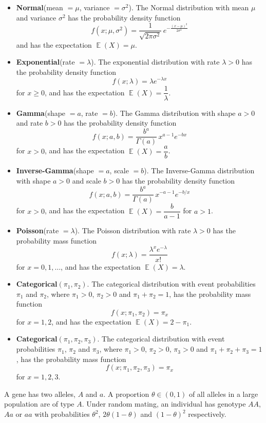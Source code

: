 \documentclass[11pt,a4paper]{article}
\newcommand{\qhead}[2]{\Needspace{10\baselineskip}\vspace{10pt}{\large\bfseries Question #1 (#2 marks)}\par\vspace{2pt}}
\DeclareMathOperator{\E}{\mathbb{E}}
\begin{document}
\begin{itemize}[itemsep=8pt]
\item \textbf{Normal}(mean $=\mu$, variance $=\sigma^2$). The Normal distribution with mean $\mu$ and variance $\sigma^2$ has the probability density function
\[ f(x;\mu,\sigma^2)=\frac{1}{\sqrt{2\pi\sigma^2}}\,e^{-\frac{(x-\mu)^2}{2\sigma^2}} \]
and has the expectation $\E(X)=\mu$.

\item \textbf{Exponential}(rate $=\lambda$). The exponential distribution with rate $\lambda>0$ has the probability density function
\[ f(x;\lambda)=\lambda e^{-\lambda x} \]
for $x\ge 0$, and has the expectation $\E(X)=\dfrac1\lambda$.

\item \textbf{Gamma}(shape $=a$, rate $=b$). The Gamma distribution with shape $a>0$ and rate $b>0$ has the probability density function
\[ f(x;a,b)=\frac{b^a}{\Gamma(a)}\,x^{a-1}e^{-bx} \]
for $x>0$, and has the expectation $\E(X)=\dfrac ab$.

\item \textbf{Inverse-Gamma}(shape $=a$, scale $=b$). The Inverse-Gamma distribution with shape $a>0$ and scale $b>0$ has the probability density function
\[ f(x;a,b)=\frac{b^a}{\Gamma(a)}\,x^{-a-1}e^{-b/x} \]
for $x>0$, and has the expectation $\E(X)=\dfrac{b}{a-1}$ for $a>1$.

\item \textbf{Poisson}(rate $=\lambda$). The Poisson distribution with rate $\lambda>0$ has the probability mass function
\[ f(x;\lambda)=\frac{\lambda^x e^{-\lambda}}{x!} \]
for $x=0,1,\dots$, and has the expectation $\E(X)=\lambda$.

\item \textbf{Categorical}$(\pi_1,\pi_2)$. The categorical distribution with event probabilities $\pi_1$ and $\pi_2$, where $\pi_1>0$, $\pi_2>0$ and $\pi_1+\pi_2=1$, has the probability mass function
\[ f(x;\pi_1,\pi_2)=\pi_x \]
for $x=1,2$, and has the expectation $\E(X)=2-\pi_1$.

\item \textbf{Categorical}$(\pi_1,\pi_2,\pi_3)$. The categorical distribution with event probabilities $\pi_1$, $\pi_2$ and $\pi_3$, where $\pi_1>0$, $\pi_2>0$, $\pi_3>0$ and $\pi_1+\pi_2+\pi_3=1$, has the probability mass function
\[ f(x;\pi_1,\pi_2,\pi_3)=\pi_x \]
for $x=1,2,3$.
\end{itemize}
\clearpage

\qhead{1}{7}
A gene has two alleles, $A$ and $a$. A proportion $\theta\in(0,1)$ of all alleles in a large population are of type $A$. Under random mating, an individual has genotype $AA$, $Aa$ or $aa$ with probabilities $\theta^2$, $2\theta(1-\theta)$ and $(1-\theta)^2$ respectively.
\end{document}
